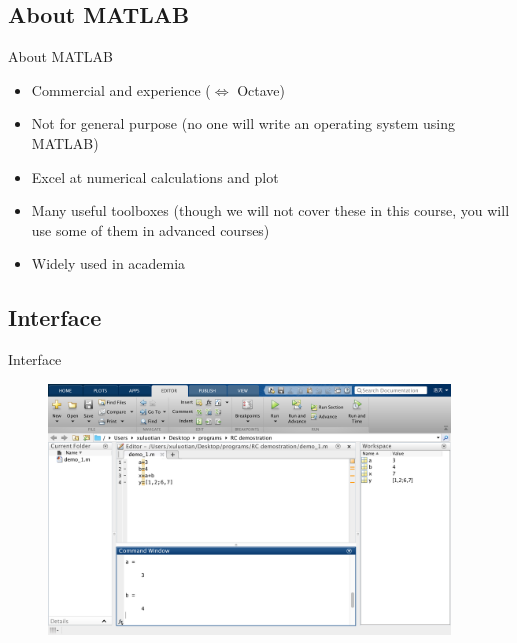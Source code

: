 \subsection{About MATLAB}
\begin{frame}{About MATLAB}
\begin{itemize}
\item Commercial and experience ($\Leftrightarrow$ Octave)
\item Not for general purpose (no one will write an operating system using MATLAB)
\item Excel at numerical calculations and plot
\item Many useful toolboxes (though we will not cover these in this course, you will use some of them in advanced courses)
\item Widely used in academia
\end{itemize}
\end{frame}

\subsection{Interface}
\begin{frame}{Interface}
\begin{figure}[htbp]
\centering
\includegraphics[width=0.95\textwidth]{pic/window.png}
\end{figure}
\end{frame}

